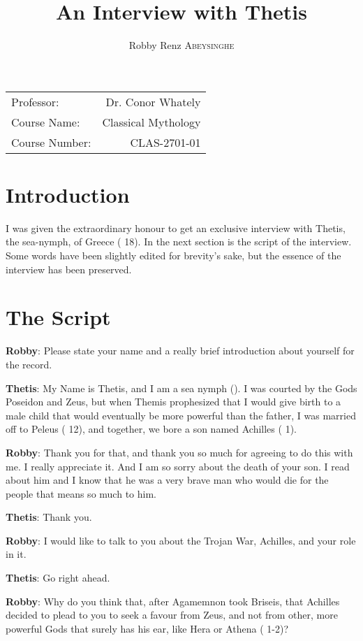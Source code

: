 \documentclass[12pt, a4paper]{article}
\author{Robby Renz \textsc{Abeysinghe}}
\title{An Interview with Thetis}
\begin{document}
\maketitle
\begin{center}
\begin{tabular}{l r}
Professor: & Dr. Conor Whately \\
Course Name: & Classical Mythology \\
Course Number: & CLAS-2701-01
\end{tabular}
\end{center}
\newpage

\section{Introduction}
I was given the extraordinary honour to get an exclusive interview with Thetis, the sea-nymph, of Greece (\cite{homer_iliad_2015} 18). In the next section is the script of the interview. Some words have been slightly edited for brevity's sake, but the essence of the interview has been preserved. 

\section{The Script}

\textbf{Robby}: Please state your name and a really brief introduction about yourself for the record.

\textbf{Thetis}: My Name is Thetis, and I am a sea nymph (\cite{homer_iliad_2015}). I was courted by the Gods Poseidon and Zeus, but when Themis prophesized that I would give birth to a male child that would eventually be more powerful than the father, I was married off to Peleus (\cite{wrath-of-thetis} 12), and together, we bore a son named Achilles (\cite{wrath-of-thetis} 1).

\textbf{Robby}: Thank you for that, and thank you so much for agreeing to do this with me. I really appreciate it. And I am so sorry about the death of your son. I read about him and I know that he was a very brave man who would die for the people that means so much to him.

\textbf{Thetis}: Thank you.

\textbf{Robby}: I would like to talk to you about the Trojan War, Achilles, and your role in it. 

\textbf{Thetis}: Go right ahead.

\textbf{Robby}: Why do you think that, after Agamemnon took Briseis, that Achilles decided to plead to you to seek a favour from Zeus, and not from other, more powerful Gods that surely has his ear, like Hera or Athena (\cite{wrath-of-thetis} 1-2)?
\end{document}
